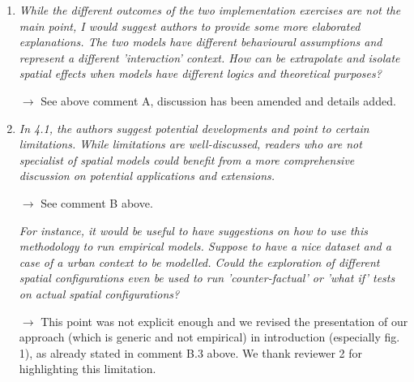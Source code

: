 \documentclass[11pt,a4paper,sans]{moderncv}        %
\begin{document}

\medskip


\begin{enumerate}

  \item \textit{While the different outcomes of the two implementation exercises are not the main point, I would suggest authors to provide some more elaborated explanations. The two models have different behavioural assumptions and represent a different 'interaction' context. How can be extrapolate and isolate spatial effects when models have different logics and theoretical purposes?}
  
  $\rightarrow$ See above comment A, discussion has been amended and details added.
  \medskip

  \item \textit{In 4.1, the authors suggest potential developments and point to certain limitations. While limitations are well-discussed, readers who are not specialist of spatial models could benefit from a more comprehensive discussion on potential applications and extensions.}
  
  $\rightarrow$ See comment B above.
  
  \medskip
  
  \textit{For instance, it would be useful to have suggestions on how to use this methodology to run empirical models. Suppose to have a nice dataset and a case of a urban context to be modelled. Could the exploration of different spatial configurations even be used to run 'counter-factual' or 'what if' tests on actual spatial configurations?}
  
  $\rightarrow$ This point was not explicit enough and we revised the presentation of our approach (which is generic and not empirical) in introduction (especially fig. 1), as already stated in comment B.3 above. We thank reviewer 2 for highlighting this limitation.
  


\end{enumerate}
\end{document}
